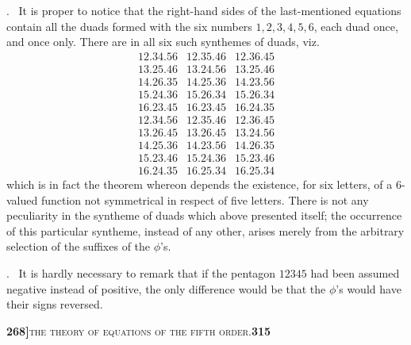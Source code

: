 \documentclass[11pt]{article}
\begin{document}
. \ It is proper to notice that the right-hand sides of the last-mentioned equations contain all the duads formed with the six numbers $1, 2, 3, 4, 5, 6$, each duad once, and once only. There are in all six such synthemes of duads, viz.
\[
\begin{array}{lll}
12.34.56 & 12.35.46 & 12.36.45\\
13.25.46 & 13.24.56 & 13.25.46\\
14.26.35 & 14.25.36 & 14.23.56\\
15.24.36 & 15.26.34 & 15.26.34\\
16.23.45 & 16.23.45 & 16.24.35\\[6pt]
12.34.56 & 12.35.46 & 12.36.45\\
13.26.45 & 13.26.45 & 13.24.56\\
14.25.36 & 14.23.56 & 14.26.35\\
15.23.46 & 15.24.36 & 15.23.46\\
16.24.35 & 16.25.34 & 16.25.34
\end{array}
\]
which is in fact the theorem whereon depends the existence, for six letters, of a 6-valued function not symmetrical in respect of five letters. There is not any peculiarity in the syntheme of duads which above presented itself; the occurrence of this particular syntheme, instead of any other, arises merely from the arbitrary selection of the suffixes of the $\phi$'s.

\medskip

. \ It is hardly necessary to remark that if the pentagon $12345$ had been assumed negative instead of positive, the only difference would be that the $\phi$'s would have their signs reversed.

\newpage
\setcounter{page}{315}

\noindent\textbf{268]}\hfill\textsc{the theory of equations of the fifth order.}\hfill\textbf{315}

\medskip
\end{document}
